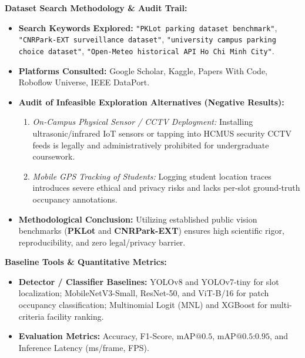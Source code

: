 \documentclass[11pt,a4paper]{article}
\begin{document}
\vspace{0.8em}
\noindent\textbf{Dataset Search Methodology \& Audit Trail:}
\begin{itemize}[leftmargin=1.5em]
    \item \textbf{Search Keywords Explored:} \texttt{"PKLot parking dataset benchmark"}, \texttt{"CNRPark-EXT surveillance dataset"}, \texttt{"university campus parking choice dataset"}, \texttt{"Open-Meteo historical API Ho Chi Minh City"}.
    \item \textbf{Platforms Consulted:} Google Scholar, Kaggle, Papers With Code, Roboflow Universe, IEEE DataPort.
    \item \textbf{Audit of Infeasible Exploration Alternatives (Negative Results):}
    \begin{enumerate}[leftmargin=1.2em]
        \item \textit{On-Campus Physical Sensor / CCTV Deployment:} Installing ultrasonic/infrared IoT sensors or tapping into HCMUS security CCTV feeds is legally and administratively prohibited for undergraduate coursework.
        \item \textit{Mobile GPS Tracking of Students:} Logging student location traces introduces severe ethical and privacy risks and lacks per-slot ground-truth occupancy annotations.
    \end{enumerate}
    \item \textbf{Methodological Conclusion:} Utilizing established public vision benchmarks (\textbf{PKLot} and \textbf{CNRPark-EXT}) ensures high scientific rigor, reproducibility, and zero legal/privacy barrier.
\end{itemize}

\vspace{0.8em}
\noindent\textbf{Baseline Tools \& Quantitative Metrics:}
\begin{itemize}[leftmargin=1.5em]
    \item \textbf{Detector / Classifier Baselines:} YOLOv8 and YOLOv7-tiny for slot localization; MobileNetV3-Small, ResNet-50, and ViT-B/16 for patch occupancy classification; Multinomial Logit (MNL) and XGBoost for multi-criteria facility ranking.
    \item \textbf{Evaluation Metrics:} Accuracy, F1-Score, $\text{mAP@0.5}$, $\text{mAP@0.5:0.95}$, and Inference Latency (ms/frame, FPS).
\end{itemize}
\end{document}
